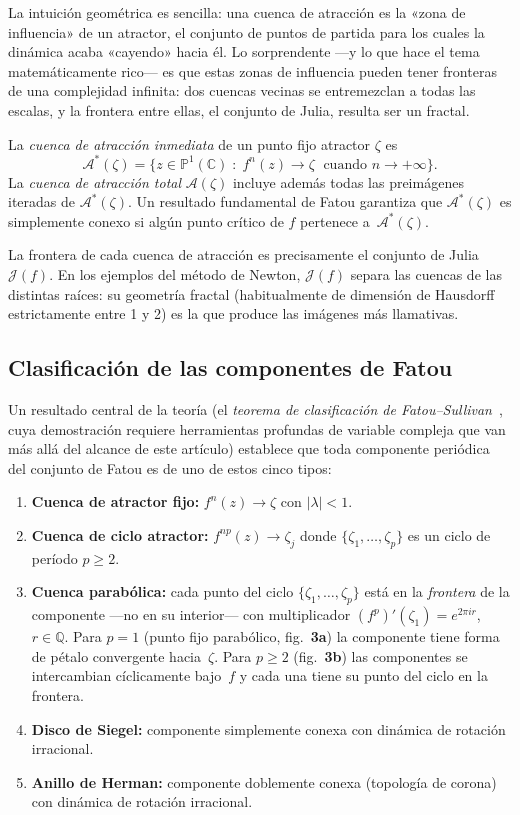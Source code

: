 \documentclass[11pt,a4paper]{article}
\theoremstyle{plain}
\theoremstyle{definition}
\theoremstyle{remark}
\newcommand{\Puno}{\mathbb{P}^1(\mathbb{C})}
\begin{document}
La intuición geométrica es sencilla: una cuenca de atracción es la «zona de influencia»
de un atractor, el conjunto de puntos de partida para los cuales la dinámica acaba
«cayendo» hacia él. Lo sorprendente ---y lo que hace el tema matemáticamente rico--- es
que estas zonas de influencia pueden tener fronteras de una complejidad infinita: dos
cuencas vecinas se entremezclan a todas las escalas, y la frontera entre ellas, el
conjunto de Julia, resulta ser un fractal.

La \emph{cuenca de atracción inmediata} de un punto fijo atractor
$\zeta$ es
\[
  \mathcal{A}^*(\zeta)=\{z\in\Puno\;:\;f^n(z)\to\zeta\;\text{ cuando }n\to + \infty
\}.
\]
La \emph{cuenca de atracción total} $\mathcal{A}(\zeta)$ incluye
además todas las preimágenes iteradas de $\mathcal{A}^*(\zeta)$.
Un resultado fundamental de Fatou garantiza que $\mathcal{A}^*(\zeta)$
es simplemente conexo si algún punto crítico de $f$ pertenece a~$\mathcal{A}^*(\zeta)$.

La frontera de cada cuenca de atracción es precisamente el conjunto
de Julia $\mathcal{J}(f)$.
En los ejemplos del método de Newton, $\mathcal{J}(f)$ separa las
cuencas de las distintas raíces: su geometría fractal (habitualmente
de dimensión de Hausdorff estrictamente entre 1 y 2) es la que produce
las imágenes más llamativas.

\subsection{Clasificación de las componentes de Fatou}

Un resultado central de la teoría (el \emph{teorema de clasificación de Fatou--Sullivan}~\cite{Milnor2006}, cuya demostración requiere herramientas profundas de variable compleja que van más allá del alcance de este artículo) establece que toda
componente periódica del conjunto de Fatou es de uno de estos cinco
tipos:

\begin{enumerate}
  \item \textbf{Cuenca de atractor fijo:} $f^n(z)\to\zeta$ con $|\lambda|<1$.
  \item \textbf{Cuenca de ciclo atractor:} $f^{np}(z)\to\zeta_j$ donde
        $\{\zeta_1,\ldots,\zeta_p\}$ es un ciclo de período $p\geq 2$.
  \item \textbf{Cuenca parabólica:} cada punto del ciclo
        $\{\zeta_1,\ldots,\zeta_p\}$ está en la \emph{frontera} de la
        componente ---no en su interior--- con multiplicador
        $(f^p)'(\zeta_1)=e^{2\pi ir}$, $r\in\mathbb{Q}$.
        Para $p=1$ (punto fijo parabólico, fig.~\textbf{3a}) la componente
        tiene forma de pétalo convergente hacia~$\zeta$.
        Para $p\geq 2$ (fig.~\textbf{3b}) las componentes se intercambian
        cíclicamente bajo~$f$ y cada una tiene su punto del ciclo en la
        frontera.
  \item \textbf{Disco de Siegel:} componente simplemente conexa con
        dinámica de rotación irracional.
  \item \textbf{Anillo de Herman:} componente doblemente conexa (topología de corona)
        con dinámica de rotación irracional.
\end{enumerate}
\end{document}
